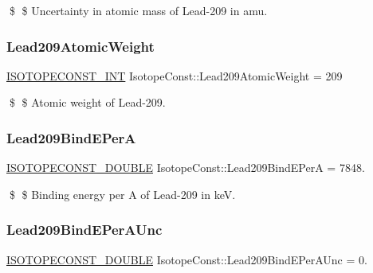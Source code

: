 \$ \$ Uncertainty in atomic mass of Lead-\/209 in amu. \mbox{\label{group___isotope_const-_lead-_pb209_ga1201c9620e878287c3bceda8becfe190}} 
\subsubsection{\texorpdfstring{Lead209\+Atomic\+Weight}{Lead209AtomicWeight}}
{\footnotesize\ttfamily \mbox{\hyperlink{group___isotope_const-_macros_ga5f18360b3e99483a35c32d789e62621c}{I\+S\+O\+T\+O\+P\+E\+C\+O\+N\+S\+T\+\_\+\+I\+NT}} Isotope\+Const\+::\+Lead209\+Atomic\+Weight = 209}

\$ \$ Atomic weight of Lead-\/209. \mbox{\label{group___isotope_const-_lead-_pb209_ga039616d45cb7ad98759909fc31855d0c}} 
\subsubsection{\texorpdfstring{Lead209\+Bind\+E\+PerA}{Lead209BindEPerA}}
{\footnotesize\ttfamily \mbox{\hyperlink{group___isotope_const-_macros_ga8f45a7272ce02c0b4c65c44636ed719a}{I\+S\+O\+T\+O\+P\+E\+C\+O\+N\+S\+T\+\_\+\+D\+O\+U\+B\+LE}} Isotope\+Const\+::\+Lead209\+Bind\+E\+PerA = 7848.}

\$ \$ Binding energy per A of Lead-\/209 in keV. \mbox{\label{group___isotope_const-_lead-_pb209_gadfa570b635b3c0a7ea2464fda08553b7}} 
\subsubsection{\texorpdfstring{Lead209\+Bind\+E\+Per\+A\+Unc}{Lead209BindEPerAUnc}}
{\footnotesize\ttfamily \mbox{\hyperlink{group___isotope_const-_macros_ga8f45a7272ce02c0b4c65c44636ed719a}{I\+S\+O\+T\+O\+P\+E\+C\+O\+N\+S\+T\+\_\+\+D\+O\+U\+B\+LE}} Isotope\+Const\+::\+Lead209\+Bind\+E\+Per\+A\+Unc = 0.}

